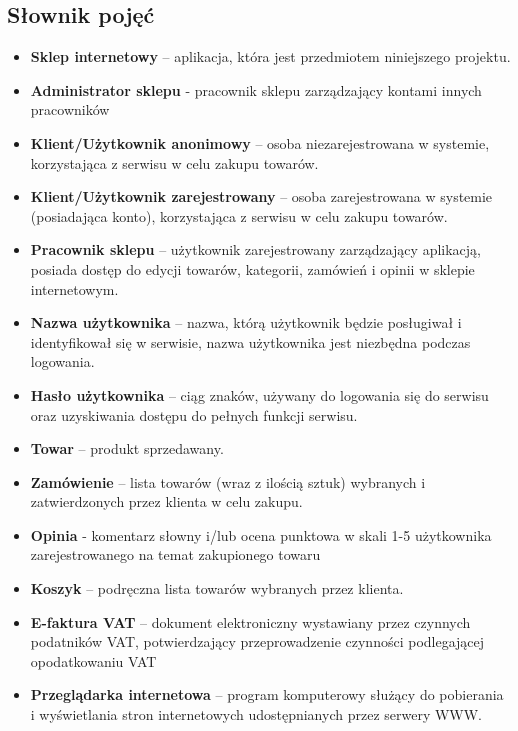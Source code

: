 \documentclass[10pt,a4paper]{article}
\begin{document}
    \subsection{Słownik pojęć}
        \begin{itemize}
		  \item \textbf{Sklep internetowy} – aplikacja, która jest przedmiotem niniejszego projektu.
		  \item \textbf{Administrator sklepu} - pracownik sklepu zarządzający kontami innych pracowników
          \item \textbf{Klient/Użytkownik anonimowy} – osoba niezarejestrowana w systemie,
           	    		korzystająca z serwisu w celu zakupu towarów.
		  \item \textbf{Klient/Użytkownik zarejestrowany} – osoba zarejestrowana w systemie (posiadająca konto),
		  				korzystająca z serwisu w celu zakupu towarów.
		  \item \textbf{Pracownik sklepu} – użytkownik zarejestrowany zarządzający aplikacją, posiada dostęp do edycji 									towarów, kategorii, zamówień i opinii w sklepie internetowym.
		  \item \textbf{Nazwa użytkownika} – nazwa, którą użytkownik będzie posługiwał i identyfikował się w serwisie,
		  	    		nazwa użytkownika jest niezbędna podczas logowania.
		  \item \textbf{Hasło użytkownika} – ciąg znaków, używany do logowania się do serwisu oraz uzyskiwania dostępu 
		  				do pełnych funkcji serwisu.
		  \item \textbf{Towar} – produkt sprzedawany.
		  \item \textbf{Zamówienie} – lista towarów (wraz z ilością sztuk) wybranych i zatwierdzonych przez 
		  				klienta w celu zakupu.
		  \item \textbf{Opinia} - komentarz słowny i/lub ocena punktowa w skali 1-5 użytkownika zarejestrowanego 
		  				na temat zakupionego towaru
		  \item \textbf{Koszyk} – podręczna lista towarów wybranych przez klienta.
		  \item \textbf{E-faktura VAT} – dokument elektroniczny wystawiany przez czynnych podatników VAT, 
		  				potwierdzający przeprowadzenie czynności podlegającej opodatkowaniu VAT
		  \item \textbf{Przeglądarka internetowa} – program komputerowy służący do pobierania i 
		  	    		wyświetlania stron internetowych udostępnianych przez serwery WWW.
		\end{itemize}
	  \newpage
\end{document}
